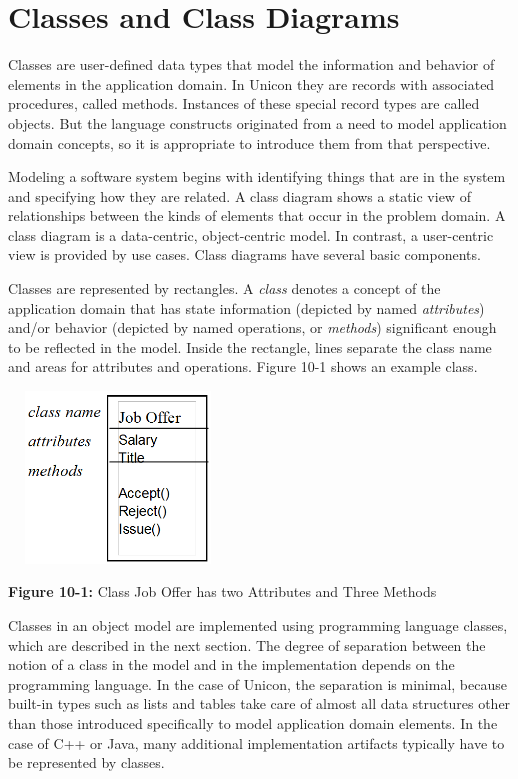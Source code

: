 \section{Classes and Class Diagrams}

Classes are user-defined data types that model the information and
behavior of elements in the application domain. In Unicon they are
records with associated procedures, called methods. Instances of these
special record types are called objects.  But the language constructs
originated from a need to model application domain concepts, so it is
appropriate to introduce them from that perspective.

Modeling a software system begins with identifying things
that are in the system and specifying how they are related. A class
diagram shows a static view of relationships between the kinds of
elements that occur in the problem domain. A class diagram is a
data-centric, object-centric model. In contrast, a
user-centric view is provided by use cases. Class
diagrams have several basic components.

Classes are represented by rectangles. A
{\em class\/} denotes a concept of the
application domain that has state information (depicted by named
\textit{attributes}) and/or behavior (depicted
by named operations, or \textit{methods}) significant
enough to be reflected in the model. Inside the rectangle, lines
separate the class name and areas for attributes and operations. Figure
10-1 shows an example class.

\bigskip

\includegraphics[width=2.3in,height=1.8in]{ub-img/umlclass.png} 

{\sffamily\bfseries Figure 10-1:}
{\sffamily Class Job Offer has two Attributes and Three Methods}

\bigskip

Classes in an object model are
implemented using programming language classes, which are described in
the next section. The degree of separation between the notion of a
class in the model and in the implementation depends on the programming
language. In the case of Unicon, the separation is minimal, because
built-in types such as lists and tables take care of almost all data
structures other than those introduced specifically to model
application domain elements. In the case of C++ or Java,
many additional implementation artifacts typically have to be
represented by classes.

